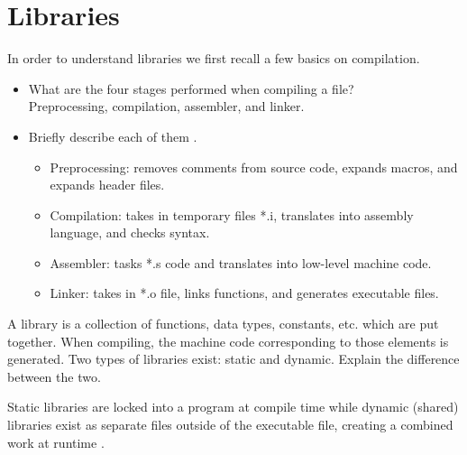 \documentclass[a4paper]{article}
\begin{document}
\section{Libraries}
In order to understand libraries we first recall a few basics on compilation.
\begin{itemize}
    \item What are the four stages performed when compiling a file?\\
    Preprocessing, compilation, assembler, and linker.
    \item Briefly describe each of them \cite{ccompile}.\\
    \begin{itemize}
        \item Preprocessing: removes comments from source code, expands macros, and expands header files.
        \item Compilation: takes in temporary files *.i, translates into assembly language, and checks syntax.
        \item Assembler: tasks *.s code and translates into low-level machine code.
        \item Linker: takes in *.o file, links functions, and generates executable files.
    \end{itemize}
\end{itemize}
A library is a collection of functions, data types, constants, etc. which are put together. When compiling, the machine code corresponding to those elements is generated. Two types of libraries exist: static and dynamic. Explain the difference between the two.

Static libraries are locked into a program at compile time while dynamic (shared) libraries exist as separate files outside of the executable file, creating a combined work at runtime \cite{slib2} \cite{slib1}.
\end{document}
